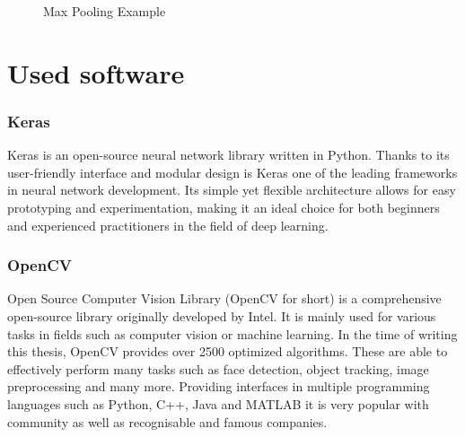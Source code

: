 \begin{figure}
	\caption[Max Pooling Example]{Max Pooling Example \cite{pooling}}
	\label{maxPooling}
\end{figure}

\section{Used software}
\subsubsection{Keras \cite{keras}}
Keras is an open-source neural network library written in Python. Thanks to its user-friendly interface and modular design is Keras one of the leading frameworks in neural network development. Its simple yet flexible architecture allows for easy prototyping and experimentation, making it an ideal choice for both beginners and experienced practitioners in the field of deep learning.
\subsubsection{OpenCV \cite{opencv}}
Open Source Computer Vision Library (OpenCV for short) is a comprehensive open-source library originally developed by Intel. It is mainly used for various tasks in fields such as computer vision or machine learning. In the time of writing this thesis, OpenCV provides over 2500 optimized algorithms. These are able to effectively perform many tasks such as face detection, object tracking, image preprocessing and many more. Providing interfaces in multiple programming languages such as Python, C++, Java and MATLAB it is very popular with community as well as recognisable and famous companies.%


